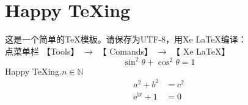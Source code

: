 \documentclass[UTF8]{ctexart} %
\begin{document}
	 \pagecolor{fgs} %
	\section{Happy \TeX ing} %
	这是一个简单的\TeX 模板。请保存为UTF-8，用Xe \LaTeX 编译： \\
	点菜单栏 【Tools】  $\to $ 【 Comands】 $\to $ 【 Xe \LaTeX 】
	\[ \sin^2 \theta + \cos^2 \theta =1 \] %
	Happy \TeX ing.$n \in \mathbb{N}$
	\begin{align} %
	    a^2+b^2 &= c^2 \\
	    \mathrm{e}^{\mathrm{i}\pi} + 1 &=0
	\end{align} %
\end{document}
